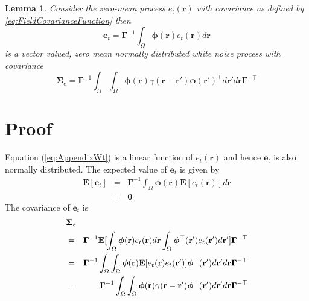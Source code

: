 \documentclass[12pt]{iopart}
\begin{document}
\section{}\label{ColoredNoise} 
\newtheorem{lemma}{Lemma} 
\begin{lemma}
	Consider the zero-mean process $e_t\left(\mathbf r\right)$ with covariance as defined by \ref{eq:FieldCovarianceFunction} then 
	\begin{equation}
		\mathbf e_t=\boldsymbol{\Gamma}^{-1}\int_\Omega {\boldsymbol{\phi} ( \mathbf{r} )e_t( \mathbf{r} )d\mathbf{r}} \label{eq:AppendixWt} 
	\end{equation}
	is a vector valued, zero mean normally distributed white noise process with covariance 
	\begin{equation}
		\boldsymbol\Sigma_e =\mathbf{\Gamma}^{-1}\int_{\Omega}\int_{\Omega}\boldsymbol{\phi}\left(\mathbf r\right) \gamma\left(\mathbf r- \mathbf r' \right)\boldsymbol{\phi}\left(\mathbf r'\right)^{\top}d\mathbf r' d\mathbf r\mathbf{\Gamma}^{- \top} 
	\end{equation}
	\label{lemma:FieldCovariance} 
\end{lemma}
\section*{Proof} Equation (\ref{eq:AppendixWt}) is a linear function of $e_t(\mathbf r)$ and hence $\mathbf{e}_t$ is also normally distributed. The expected value of $\mathbf e_t$ is given by 
\begin{eqnarray}
	\mathbf E\left[ \mathbf e_t\right]&=& \mathbf{\Gamma}^{-1}\int_{\Omega}\boldsymbol\phi\left(\mathbf{r}\right)\mathbf E\left[e_t\left(\mathbf{r}\right)\right] d\mathbf{r} \nonumber \\
	&=&\mathbf 0 
\end{eqnarray}
The covariance of $\mathbf{e}_t$ is 
\begin{eqnarray}
	\lefteqn{\mathbf{\Sigma}_e} \nonumber \\ 
&=&\mathbf{\Gamma}^{-1}\mathbf E[\int_{\Omega}\boldsymbol{\phi}(\mathbf{r})e_t(\mathbf{r})d\mathbf{r} \int_{\Omega}\boldsymbol{\phi}^{\top}(\mathbf{r}') e_t(\mathbf{r}')d\mathbf{r}']\mathbf{\Gamma}^{- \top} \nonumber \\
	&=&\mathbf{\Gamma}^{-1}\int_{\Omega}\int_{\Omega} \boldsymbol{\phi}(\mathbf{r}) \mathbf E[e_t(\mathbf{r})e_t(\mathbf{r}')]\boldsymbol{\phi}^{\top}(\mathbf{r}')d\mathbf{r}' d\mathbf r\mathbf{\Gamma}^{- \top} \nonumber\\
	&=&\mathbf{\Gamma}^{-1}\int_{\Omega}\int_{\Omega}\boldsymbol{\phi}(\mathbf r) \gamma(\mathbf r- \mathbf r' )\boldsymbol{\phi}^{\top}(\mathbf r')d\mathbf r' d\mathbf r\mathbf{\Gamma}^{-\top} 
\end{eqnarray}
\end{document}
